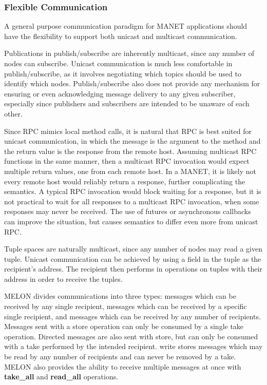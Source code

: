 \documentclass[lnicst]{svmultln}
\begin{document}
\subsubsection{Flexible Communication}

A general purpose communication paradigm for MANET applications should have the flexibility to support both unicast and multicast communication.

Publications in publish/subscribe are inherently multicast, since any number of nodes can subscribe. Unicast communication is much less comfortable in publish/subscribe, as it involves negotiating which topics should be used to identify which nodes. Publish/subscribe also does not provide any mechanism for ensuring or even acknowledging message delivery to any given subscriber, especially since publishers and subscribers are intended to be unaware of each other.

Since RPC mimics local method calls, it is natural that RPC is best suited for unicast communication, in which the message is the argument to the method and the return value is the response from the remote host. Assuming multicast RPC functions in the same manner, then a multicast RPC invocation would expect multiple return values, one from each remote host. In a MANET, it is likely not every remote host would reliably return a response, further complicating the semantics. A typical RPC invocation would block waiting for a response, but it is not practical to wait for all responses to a multicast RPC invocation, when some responses may never be received. The use of futures or asynchronous callbacks can improve the situation, but causes semantics to differ even more from unicast RPC.

Tuple spaces are naturally multicast, since any number of nodes may read a given tuple. Unicast communication can be achieved by using a field in the tuple as the recipient’s address. The recipient then performs in operations on tuples with their address in order to receive the tuples.

MELON divides communications into three types: messages which can be received by any single recipient, messages which can be received by a specific single recipient, and messages which can be received by any number of recipients. Messages sent with a store operation can only be consumed by a single take operation. Directed messages are also sent with store, but can only be consumed with a take performed by the intended recipient. write stores messages which may be read by any number of recipients and can never be removed by a take. MELON also provides the ability to receive multiple messages at once with \textbf{take\_all} and \textbf{read\_all} operations.    
    
\end{document}
